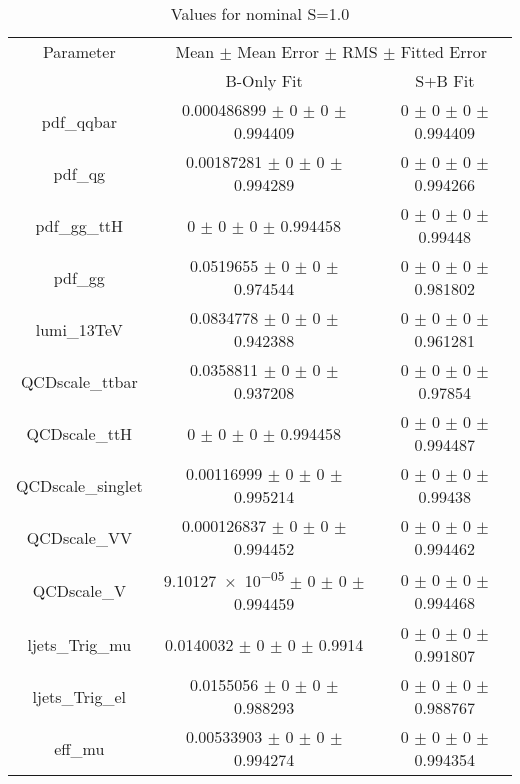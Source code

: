 \begin{table}
\centering
\caption{Values for nominal S=1.0}
\begin{tabular}{ccc}
\toprule
Parameter & \multicolumn{2}{c}{Mean $\pm$ Mean Error $\pm$ RMS $\pm$ Fitted Error}\\
 & B-Only Fit & S+B Fit\\
\midrule
pdf\_qqbar & \num{0.000486899} $\pm$ \num{0} $\pm$ \num{0} $\pm$ \num{0.994409} & \num{0} $\pm$ \num{0} $\pm$ \num{0} $\pm$ \num{0.994409}\\
pdf\_qg & \num{0.00187281} $\pm$ \num{0} $\pm$ \num{0} $\pm$ \num{0.994289} & \num{0} $\pm$ \num{0} $\pm$ \num{0} $\pm$ \num{0.994266}\\
pdf\_gg\_ttH & \num{0} $\pm$ \num{0} $\pm$ \num{0} $\pm$ \num{0.994458} & \num{0} $\pm$ \num{0} $\pm$ \num{0} $\pm$ \num{0.99448}\\
pdf\_gg & \num{0.0519655} $\pm$ \num{0} $\pm$ \num{0} $\pm$ \num{0.974544} & \num{0} $\pm$ \num{0} $\pm$ \num{0} $\pm$ \num{0.981802}\\
lumi\_13TeV & \num{0.0834778} $\pm$ \num{0} $\pm$ \num{0} $\pm$ \num{0.942388} & \num{0} $\pm$ \num{0} $\pm$ \num{0} $\pm$ \num{0.961281}\\
QCDscale\_ttbar & \num{0.0358811} $\pm$ \num{0} $\pm$ \num{0} $\pm$ \num{0.937208} & \num{0} $\pm$ \num{0} $\pm$ \num{0} $\pm$ \num{0.97854}\\
QCDscale\_ttH & \num{0} $\pm$ \num{0} $\pm$ \num{0} $\pm$ \num{0.994458} & \num{0} $\pm$ \num{0} $\pm$ \num{0} $\pm$ \num{0.994487}\\
QCDscale\_singlet & \num{0.00116999} $\pm$ \num{0} $\pm$ \num{0} $\pm$ \num{0.995214} & \num{0} $\pm$ \num{0} $\pm$ \num{0} $\pm$ \num{0.99438}\\
QCDscale\_VV & \num{0.000126837} $\pm$ \num{0} $\pm$ \num{0} $\pm$ \num{0.994452} & \num{0} $\pm$ \num{0} $\pm$ \num{0} $\pm$ \num{0.994462}\\
QCDscale\_V & \num{9.10127e-05} $\pm$ \num{0} $\pm$ \num{0} $\pm$ \num{0.994459} & \num{0} $\pm$ \num{0} $\pm$ \num{0} $\pm$ \num{0.994468}\\
ljets\_Trig\_mu & \num{0.0140032} $\pm$ \num{0} $\pm$ \num{0} $\pm$ \num{0.9914} & \num{0} $\pm$ \num{0} $\pm$ \num{0} $\pm$ \num{0.991807}\\
ljets\_Trig\_el & \num{0.0155056} $\pm$ \num{0} $\pm$ \num{0} $\pm$ \num{0.988293} & \num{0} $\pm$ \num{0} $\pm$ \num{0} $\pm$ \num{0.988767}\\
eff\_mu & \num{0.00533903} $\pm$ \num{0} $\pm$ \num{0} $\pm$ \num{0.994274} & \num{0} $\pm$ \num{0} $\pm$ \num{0} $\pm$ \num{0.994354}\\

\end{tabular}
\end{table}
